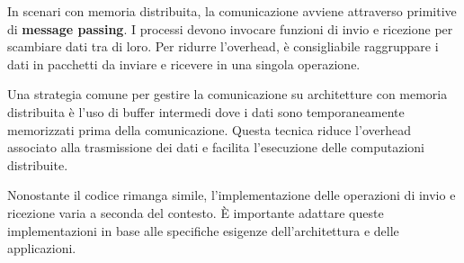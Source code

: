 In scenari con memoria distribuita, la comunicazione avviene attraverso primitive di \textbf{message passing}. I processi devono invocare funzioni di invio e ricezione per scambiare dati tra di loro. Per ridurre l'overhead, è consigliabile raggruppare i dati in pacchetti da inviare e ricevere in una singola operazione.

Una strategia comune per gestire la comunicazione su architetture con memoria distribuita è l'uso di buffer intermedi dove i dati sono temporaneamente memorizzati prima della comunicazione. Questa tecnica riduce l'overhead associato alla trasmissione dei dati e facilita l'esecuzione delle computazioni distribuite.

Nonostante il codice rimanga simile, l'implementazione delle operazioni di invio e ricezione varia a seconda del contesto. È importante adattare queste implementazioni in base alle specifiche esigenze dell'architettura e delle applicazioni.
